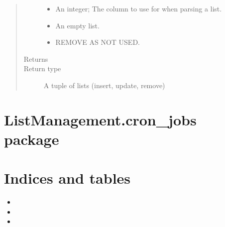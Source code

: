 \documentclass[letterpaper,10pt,english]{sphinxmanual}
\begin{document}
\begin{fulllineitems}
\begin{quote}
\begin{description}
\begin{itemize}
\item {} 
 \textendash{} An integer; The column to use for when parsing a list.

\item {} 
 \textendash{} An empty list.

\item {} 
 \textendash{} REMOVE AS NOT USED.

\end{itemize}

\item[{Returns}] \leavevmode


\item[{Return type}] \leavevmode
A tuple of lists (insert, update, remove)

\end{description}\end{quote}

\end{fulllineitems}



\chapter{ListManagement.cron\_jobs package}
\label{\detokenize{index:module-ListManagement.cron_jobs}}\label{\detokenize{index:listmanagement-cron-jobs-package}}\label{\detokenize{index:module-ListManagement.cron_jobs.created_contacts_to_campaign}}\label{\detokenize{index:module-ListManagement.cron_jobs.ml_diagnostics_update}}\label{\detokenize{index:module-ListManagement.cron_jobs.requested_email_job}}

\chapter{Indices and tables}
\label{\detokenize{index:indices-and-tables}}\begin{itemize}
\item {} 

\item {} 

\item {} 

\end{itemize}
\end{document}
